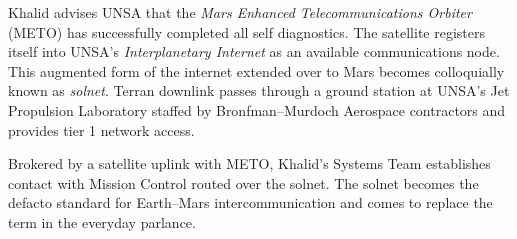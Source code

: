 Khalid advises UNSA that the {\it Mars Enhanced Telecommunications Orbiter} (METO) has successfully completed all self diagnostics. The satellite registers itself into UNSA's {\it Interplanetary Internet} as an available communications node. This augmented form of the internet extended over to Mars becomes colloquially known as {\it solnet}. Terran downlink passes through a ground station at UNSA's Jet Propulsion Laboratory staffed by Bronfman--Murdoch Aerospace contractors and provides tier 1 network access.

Brokered by a satellite uplink with METO, Khalid's Systems Team establishes contact with Mission Control routed over the solnet. The solnet becomes the defacto standard for Earth--Mars intercommunication and comes to replace the term  in the everyday parlance.
\StopTimelineDate

